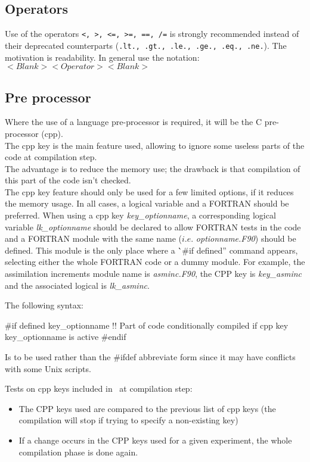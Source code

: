 \subsection{Operators}

Use of the operators \texttt{<, >, <=, >=, ==, /=} is strongly recommended instead of their deprecated counterparts
(\texttt{.lt., .gt., .le., .ge., .eq., .ne.}).
The motivation is readability.
In general use the notation: \\
$<Blank><Operator><Blank>$

\subsection{Pre processor}

Where the use of a language pre-processor is required, it will be the C pre-processor (cpp). \\
The cpp key is the main feature used, allowing to ignore some useless parts of the code at compilation step. \\
The advantage is to reduce the memory use; the drawback is that compilation of this part of the code isn't checked. \\
The cpp key feature should only be used for a few limited options, if it reduces the memory usage.
In all cases, a logical variable and a FORTRAN  should be preferred.
When using a cpp key \textit{key\_optionname},
a corresponding logical variable \textit{lk\_optionname} should be declared to
allow FORTRAN  tests in the code and
a FORTRAN module with the same name ($i.e.$ \textit{optionname.F90}) should be defined.
This module is the only place where a \``\#if defined'' command appears, selecting either the whole FORTRAN code or
a dummy module.
For example, the assimilation increments module name is \textit{asminc.F90},
the CPP key is \textit{key\_asminc} and the associated logical is \textit{lk\_asminc}.

The following syntax:

\begin{forlines}
#if defined key_optionname
!! Part of code conditionally compiled if cpp key key_optionname is active
#endif
\end{forlines}

Is to be used rather than the \#ifdef abbreviate form since it may have conflicts with some Unix scripts.

Tests on cpp keys included in \NEMO\ at compilation step:

\begin{itemize}
\item
  The CPP keys used are compared to the previous list of cpp keys
  (the compilation will stop if trying to specify a non-existing key)
\item
  If a change occurs in the CPP keys used for a given experiment, the whole compilation phase is done again.
\end{itemize}

